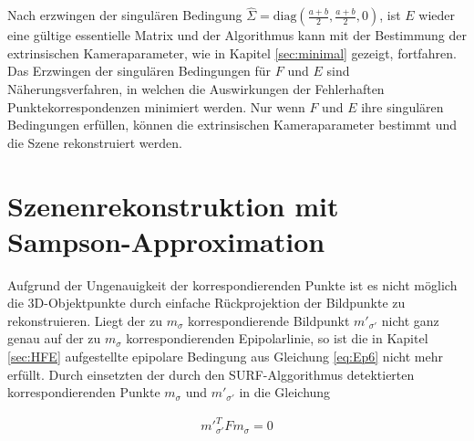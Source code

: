 Nach erzwingen der singulären Bedingung $\hat{\Sigma} = \text{diag}(\frac{a+b}{2},\frac{a+b}{2},0)$, ist $E$ wieder eine gültige essentielle Matrix und der Algorithmus kann mit der Bestimmung der extrinsischen Kameraparameter, wie in Kapitel \ref{sec:minimal} gezeigt, fortfahren.\\

Das Erzwingen der singulären Bedingungen für $F$ und $E$ sind Näherungsverfahren, in welchen die Auswirkungen der Fehlerhaften Punktekorrespondenzen minimiert werden. Nur wenn $F$ und $E$ ihre singulären Bedingungen erfüllen, können die extrinsischen Kameraparameter bestimmt und die Szene rekonstruiert werden\cite{HZ}.

\section{Szenenrekonstruktion mit Sampson-Approximation}
\label{sec:sampson}

Aufgrund der Ungenauigkeit der korrespondierenden Punkte ist es nicht möglich die 3D-Objektpunkte durch einfache Rückprojektion der Bildpunkte zu rekonstruieren. Liegt der zu $m_\sigma$ korrespondierende Bildpunkt $m'_{\sigma'}$ nicht ganz genau auf der zu $m_\sigma$ korrespondierenden Epipolarlinie, so ist die in Kapitel \ref{sec:HFE} aufgestellte epipolare Bedingung aus Gleichung \ref{eq:Ep6} nicht mehr erfüllt. Durch einsetzten der durch den SURF-Alggorithmus detektierten korrespondierenden Punkte $m_\sigma$ und $m'_{\sigma'}$ in die Gleichung 

\begin{gather}
	m'^T_{\sigma'}Fm_\sigma = 0
\end{gather}

